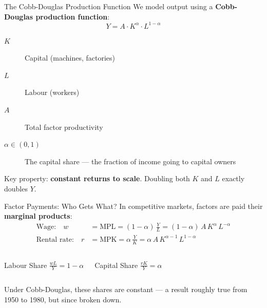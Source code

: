 \documentclass[aspectratio=169, 10pt]{beamer}
\begin{document}
\begin{frame}{The Cobb-Douglas Production Function}
We model output using a \textbf{Cobb-Douglas production function}:
\vspace{0.3em}
\[
  Y = A \cdot K^{\alpha} \cdot L^{1-\alpha}
\]
\vspace{0.3em}
\begin{description}
  \item[$K$] Capital (machines, factories)
  \item[$L$] Labour (workers)
  \item[$A$] Total factor productivity
  \item[$\alpha \in (0,1)$] The \alert{capital share} --- the fraction
        of income going to capital owners
\end{description}
\vspace{0.5em}
Key property: \textbf{constant returns to scale}.
Doubling both $K$ and $L$ exactly doubles $Y$.
\end{frame}

\begin{frame}{Factor Payments: Who Gets What?}
In competitive markets, factors are paid their \textbf{marginal products}:
\vspace{0.3em}
\begin{align*}
  \text{Wage:} \quad w &= \text{MPL} = (1-\alpha)\,\frac{Y}{L}
      = (1-\alpha)\,A\,K^{\alpha}\,L^{-\alpha} \\[8pt]
  \text{Rental rate:} \quad r &= \text{MPK} = \alpha\,\frac{Y}{K}
      = \alpha\,A\,K^{\alpha-1}\,L^{1-\alpha}
\end{align*}
\vspace{0.3em}
\begin{columns}[T]
\begin{block}{Labour Share}
  $\displaystyle \frac{wL}{Y} = 1 - \alpha$
\end{block}
\begin{block}{Capital Share}
  $\displaystyle \frac{rK}{Y} = \alpha$
\end{block}
\end{columns}
\vspace{0.5em}
Under Cobb-Douglas, these shares are \alert{constant} ---
a result roughly true from 1950 to 1980, but since broken down.
\end{frame}
\end{document}
